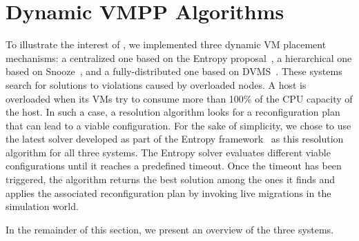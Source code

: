 \section{Dynamic VMPP Algorithms}
\label{sec:vm-schedulers}

To illustrate the interest of \vmps, we implemented three dynamic VM
placement mechanisms: a centralized one based on the Entropy
proposal~\cite{Hermenier:2009:ECM:1508293.1508300}, a hierarchical one
based on Snooze~\cite{feller:ccgrid12}, and a fully-distributed one
based on DVMS~\cite{quesnel:cpe2012}.
%
These systems search for solutions to violations caused by overloaded
nodes. A host is overloaded when its VMs try to consume more than
100\% of the CPU capacity of the host. In such a case, a resolution
algorithm looks for a reconfiguration plan that can lead to a viable
configuration. For the sake of simplicity, we chose to use the latest
solver developed as part of the Entropy
framework~\cite{hermenier:cp11} as this resolution algorithm for all
three systems.  The Entropy solver evaluates different viable
configurations until it reaches a predefined timeout.
Once the timeout has been triggered, the algorithm returns the best
solution among the ones it finds and applies the associated
reconfiguration plan by invoking live migrations in the simulation
world.
%
%

%
In the remainder of this section, we present an overview of the
three systems.


